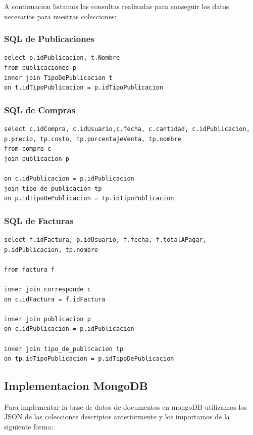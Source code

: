 \documentclass[a4paper, 10pt, twoside]{article}
\begin{document}
A continuacion listamos las consultas realizadas para conseguir los datos necesarios para nuestras colecciones:
\subsubsection{SQL de Publicaciones}

\begin{verbatim}
select p.idPublicacion, t.Nombre
from publicaciones p
inner join TipoDePublicacion t
on t.idTipoPublicacion = p.idTipoPublicacion
\end{verbatim}

\newpage
\subsubsection{SQL de Compras}

\begin{verbatim}
select c.idCompra, c.idUsuario,c.fecha, c.cantidad, c.idPublicacion, p.precio, tp.costo, tp.porcentajeVenta, tp.nombre  
from compra c 
join publicacion p
 
on c.idPublicacion = p.idPublicacion
join tipo_de_publicacion tp
on p.idTipoDePublicacion = tp.idTipoPublicacion

\end{verbatim}

\subsubsection{SQL de Facturas}
\begin{verbatim}
select f.idFactura, p.idUsuario, f.fecha, f.totalAPagar, p.idPublicacion, tp.nombre

from factura f

inner join corresponde c
on c.idFactura = f.idFactura

inner join publicacion p
on c.idPublicacion = p.idPublicacion

inner join tipo_de_publicacion tp
on tp.idTipoPublicacion = p.idTipoDePublicacion

\end{verbatim}

\subsection{Implementacion MongoDB}
Para implementar la base de datos de documentos en mongoDB utilizamos los JSON de las colecciones descriptos anteriormente y los importamos de la siguiente forma:
\end{document}
